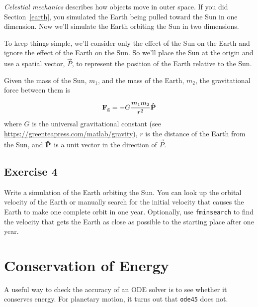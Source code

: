 
\emph{Celestial mechanics} describes how objects move in outer space.
If you did  Section~\ref{earth}, you simulated the Earth being pulled toward the Sun in one dimension.  Now we'll simulate the Earth orbiting the Sun in two dimensions.


To keep things simple, we'll consider only the effect of the Sun on the Earth and ignore the effect of the Earth on the Sun.  So we'll place the Sun at the origin and use a spatial vector, $\vec{P}$, to represent the position of the Earth relative to the Sun.


Given the mass of the Sun, $m_{1}$, and the mass of the Earth, $m_{2}$, the gravitational force between them is

\begin{equation*}
\vec{F}_\mathrm{g} = -G \frac{m_1 m_2}{r^2} \uvec{P}
\end{equation*}
where $G$ is the universal gravitational constant (see \url{https://greenteapress.com/matlab/gravity}),
$r$ is the distance of the Earth from the Sun, and
$\uvec{P}$ is a unit vector in the direction of $\vec{P}$.


\subsection{Exercise 4}
Write a simulation of the Earth orbiting the Sun.  You can look up the orbital velocity of the Earth or manually search for the initial velocity that causes the Earth to make one complete orbit in one year.  Optionally, use \lstinline{fminsearch} to find the velocity that gets the Earth as close as possible to the starting place after one year.



\section{Conservation of Energy}

A useful way to check the accuracy of an ODE solver is to see whether it conserves energy.  For planetary motion, it turns out that \lstinline{ode45} does not.

